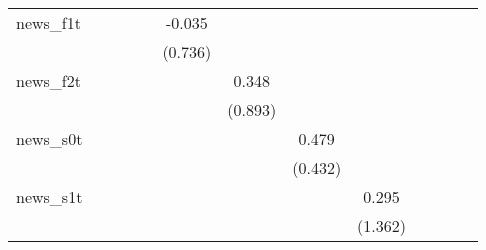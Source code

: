 {\begin{tabular}{l*{12}{c}}
\addlinespace
news\_f1t    &                     &                     &                     &                     &      -0.035         &                     &                     &                     &                     &                     &                     &                     \\
            &                     &                     &                     &                     &     (0.736)         &                     &                     &                     &                     &                     &                     &                     \\
\addlinespace
news\_f2t    &                     &                     &                     &                     &                     &       0.348         &                     &                     &                     &                     &                     &                     \\
            &                     &                     &                     &                     &                     &     (0.893)         &                     &                     &                     &                     &                     &                     \\
\addlinespace
news\_s0t    &                     &                     &                     &                     &                     &                     &       0.479         &                     &                     &                     &                     &                     \\
            &                     &                     &                     &                     &                     &                     &     (0.432)         &                     &                     &                     &                     &                     \\
\addlinespace
news\_s1t    &                     &                     &                     &                     &                     &                     &                     &       0.295         &                     &                     &                     &                     \\
            &                     &                     &                     &                     &                     &                     &                     &     (1.362)         &                     &                     &                     &                     \\

\end{tabular}}
